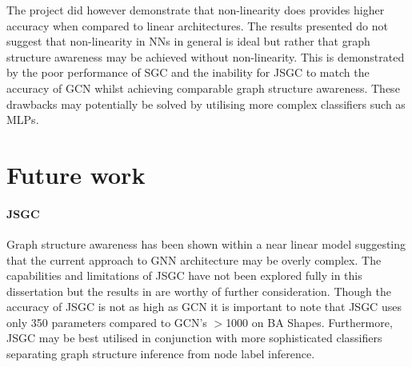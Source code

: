 The project did however demonstrate that non-linearity does provides higher accuracy when compared to linear architectures.
The results presented do not suggest that non-linearity in NNs in general is ideal but rather that graph structure awareness may be achieved without non-linearity.
This is demonstrated by the poor performance of SGC and the inability for JSGC to match the accuracy of GCN whilst achieving comparable graph structure awareness.
These drawbacks may potentially be solved by utilising more complex classifiers such as MLPs.

%
%

\section{Future work}
\paragraph{JSGC}
Graph structure awareness has been shown within a near linear model suggesting that the current approach to GNN architecture may be overly complex.
The capabilities and limitations of JSGC have not been explored fully in this dissertation but the results in  are worthy of further consideration.
Though the accuracy of JSGC is not as high as GCN it is important to note that JSGC uses only 350 parameters compared to GCN's $>$1000 on BA Shapes.
Furthermore, JSGC may be best utilised in conjunction with more sophisticated classifiers separating graph structure inference from node label inference.

